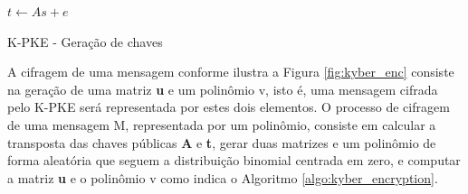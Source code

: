     \begin{algorithm}[!htbp]
        \SetAlgoLined
        



        $t \leftarrow As + e$\\
        
    
        \caption{K-PKE - Geração de chaves}
        \label{algo:kyber_keygen}
    \end{algorithm}

    A cifragem de uma mensagem conforme ilustra a Figura \ref{fig:kyber_enc} consiste na geração de uma matriz \textbf{u} e um polinômio v, isto é, uma mensagem cifrada pelo K-PKE será representada por estes dois elementos. O processo de cifragem de uma mensagem M, representada por um polinômio, consiste em calcular a transposta das chaves públicas \textbf{A} e \textbf{t}, gerar duas matrizes e um polinômio de forma aleatória que seguem a distribuição binomial centrada em zero, e computar a matriz \textbf{u} e o polinômio v como indica o Algoritmo \ref{algo:kyber_encryption}.

